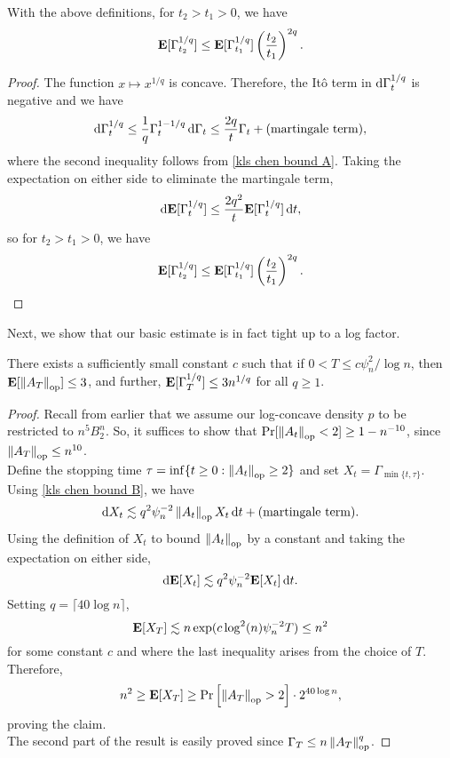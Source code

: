 		\begin{corollary}
			\label{chen: expectation of potential A}	
			With the above definitions, for $t_2 > t_1 > 0$, we have
			\begin{equation}
				\textbf{E}[\Gamma_{t_2}^{1/q}] \leq \textbf{E}[\Gamma_{t_1}^{1/q}] \left(\frac{t_2}{t_1}\right)^{2q}.	
			\end{equation}
		\end{corollary}
		\begin{proof}
			The function $x \mapsto x^{1/q}$ is concave. Therefore, the It\^{o} term in $\operatorname{d}\!{\Gamma_t^{1/q}}$ is negative and we have
			\[ \operatorname{d}\!{\Gamma_t^{1/q}} \leq \frac{1}{q} \Gamma_t^{1-1/q}\operatorname{d}\!{\Gamma_t} \leq \frac{2q}{t} \Gamma_t + \text{(martingale term)}, \]
			where the second inequality follows from \eqref{kls chen bound A}. Taking the expectation on either side to eliminate the martingale term,
			\[ \operatorname{d}\!{\textbf{E}[\Gamma_t^{1/q}]} \leq \frac{2q^2}{t} \textbf{E}[\Gamma_t^{1/q}]\operatorname{d}\!{t}, \]
			so for $t_2 > t_1 > 0$, we have
			\[ \textbf{E}[\Gamma_{t_2}^{1/q}] \leq \textbf{E}[\Gamma_{t_1}^{1/q}] \left(\frac{t_2}{t_1}\right)^{2q}. \qedhere \]
		\end{proof}

		Next, we show that our basic estimate  is in fact tight up to a log factor.

		\begin{corollary}
			\label{chen: expectation of potential B}
			There exists a sufficiently small constant $c$ such that if $0 < T \leq c \psi_n^2 / \log n$, then $\textbf{E}[\left\lVert A_T\right\rVert_{\text{op}}] \leq 3$, and further, $\textbf{E}[\Gamma_T^{1/q}] \leq 3n^{1/q}$ for all $q \geq 1$.
		\end{corollary}
		\begin{proof}
			Recall from earlier that we assume our log-concave density $p$ to be restricted to $n^5 B_2^n$. So, it suffices to show that $\Pr[\left\lVert A_t\right\rVert_{\text{op}} < 2] \geq 1 - n^{-10}$, since $\left\lVert A_T\right\rVert_{\text{op}} \leq n^{10}$.\\
			Define the stopping time $\tau = \inf\{t \geq 0 : \left\lVert A_t\right\rVert_{\text{op}} \geq 2 \}$ and set $X_t = \Gamma_{\min\{t,\tau\}}$. Using \eqref{kls chen bound B}, we have
			\[ \operatorname{d}\!{X_t} \lesssim q^2\psi_n^{-2}\left\lVert A_t\right\rVert_{\text{op}}X_t\operatorname{d}\!{t} + \text{(martingale term)}. \]
			Using the definition of $X_t$ to bound $\left\lVert A_t\right\rVert_{\text{op}}$ by a constant and taking the expectation on either side,
			\[ \operatorname{d}\!{\textbf{E}[X_t]} \lesssim q^2\psi_n^{-2}\textbf{E}[X_t]\operatorname{d}\!{t}. \]
			Setting $q = \lceil 40 \log n \rceil$,
			\[ \textbf{E}[X_T] \lesssim n \exp(c\log^2 (n)\psi_n^{-2}T) \leq n^2 \]
			for some constant $c$ and where the last inequality arises from the choice of $T$. Therefore,
			\[ n^2 \geq \textbf{E}[X_T] \geq \Pr\left[ \left\lVert A_T\right\rVert_{\text{op}} > 2 \right] \cdot 2^{40 \log n}, \]
			proving the claim.\\
			The second part of the result is easily proved since $\Gamma_T \leq n\left\lVert A_T\right\rVert_{\text{op}}^q$.
		\end{proof}

